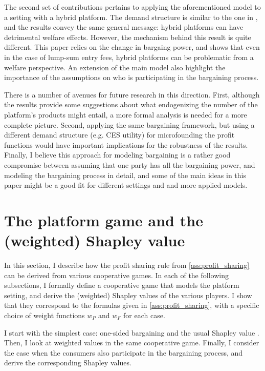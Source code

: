 \documentclass[a4paper]{article}
\begin{document}
The second set of contributions pertains to applying the aforementioned model to a setting with a hybrid platform.
The demand structure is similar to the one in \textcite{anderson2021hybrid}, and the results convey the same general message: hybrid platforms can have detrimental welfare effects.
However, the mechanism behind this result is quite different.
This paper relies on the change in bargaing power, and shows that even in the case of lump-sum entry fees, hybrid platforms can be problematic from a welfare perspective.
An extension of the main model also highlight the importance of the assumptions on who is participating in the bargaining process.

There is a number of avenues for future research in this direction.
First, although the results provide some suggestions about what endogenizing the number of the platform's products might entail, a more formal analysis is needed for a more complete picture.
Second, applying the same bargaining framework, but using a different demand structure (e.g. CES utility) for microfounding the profit functions would have important implications for the robustness of the results.
Finally, I believe this approach for modeling bargaining is a rather good compromise between assuming that one party has all the bargaining power, and modeling the bargaining process in detail, and some of the main ideas in this paper might be a good fit for different settings and and more applied models.


\appendix

\printbibliography


\section{The platform game and the (weighted) Shapley value}
\label{sec:cooperative_game}

In this section, I describe how the profit sharing rule from \cref{ass:profit_sharing} can be derived from various cooperative games.
In each of the following subsections, I formally define a cooperative game that models the platform setting, and derive the (weighted) Shapley values of the various players.
I show that they correspond to the formulas given in \cref{ass:profit_sharing}, with a specific choice of weight functions $w_P$ and $w_F$ for each case.

I start with the simplest case: one-sided bargaining and the usual Shapley value \parencite{shapley1953additive}.
Then, I look at weighted values \parencite{weber1988probabilistic} in the same cooperative game.
Finally, I consider the case when the consumers also participate in the bargaining process, and derive the corresponding Shapley values.
\end{document}
